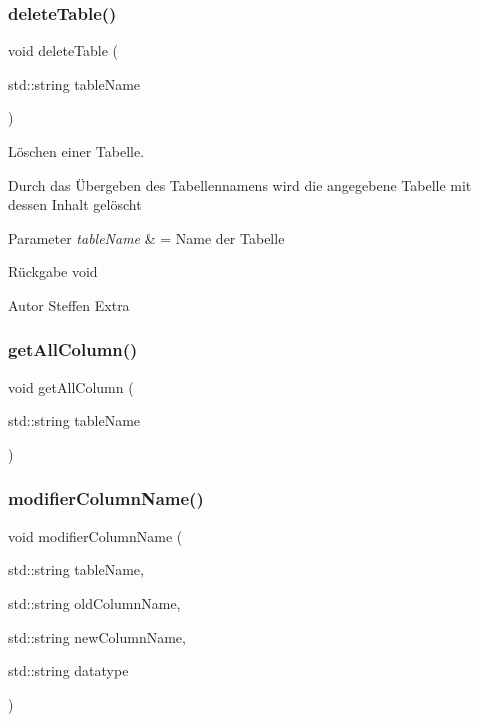 \mbox{\label{tables_8cpp_a9754762b2c19711bf3dcbfceca61d97d}} 
\subsubsection{delete\+Table()}
{\footnotesize\ttfamily void delete\+Table (\begin{DoxyParamCaption}\item[{std\+::string}]{table\+Name }\end{DoxyParamCaption})}



Löschen einer Tabelle. 

Durch das Übergeben des Tabellennamens wird die angegebene Tabelle mit dessen Inhalt gelöscht


\begin{DoxyParams}{Parameter}
{\em table\+Name} & = Name der Tabelle\\
\hline
\end{DoxyParams}
\begin{DoxyReturn}{Rückgabe}
void
\end{DoxyReturn}
\begin{DoxyAuthor}{Autor}
Steffen Extra 
\end{DoxyAuthor}
\mbox{\label{tables_8cpp_aceb780082d3f7392e485cac394d6c606}} 
\subsubsection{get\+All\+Column()}
{\footnotesize\ttfamily void get\+All\+Column (\begin{DoxyParamCaption}\item[{std\+::string}]{table\+Name }\end{DoxyParamCaption})}

\mbox{\label{tables_8cpp_a244b10b3b373f8a174943176101a480f}} 
\subsubsection{modifier\+Column\+Name()}
{\footnotesize\ttfamily void modifier\+Column\+Name (\begin{DoxyParamCaption}\item[{std\+::string}]{table\+Name,  }\item[{std\+::string}]{old\+Column\+Name,  }\item[{std\+::string}]{new\+Column\+Name,  }\item[{std\+::string}]{datatype }\end{DoxyParamCaption})}




